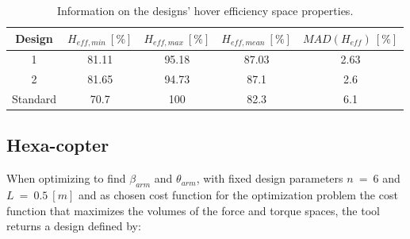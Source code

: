 {\begin{table}[!ht]
\begin{center}
 \caption{Information on the designs’ torque space properties.}\vspace{1ex}
 \label{tab:tab_Quad_compare_torque}
\end{center}
\end{table}

\begin{table}[!ht]
\begin{center}
 \caption{Information on the designs’ hover efficiency space properties.}\vspace{1ex}
 \label{tab:tab_Quad_compare_hover}
 {\scriptsize\begin{tabular}{|c|cccc|}
 \hline
  Design & $H_{eff,min}\ [\%]$ & $H_{eff,max}\ [\%]$ & $H_{eff,mean}\ [\%]$
  & $MAD(H_{eff})\ [\%]$\\ \hline
  1 & 81.11 & 95.18 & 87.03 & 2.63\\
  2 & 81.65 & 94.73 & 87.1 & 2.6\\
  Standard & 70.7 & 100 & 82.3 & 6.1\\
 \hline
\end{tabular}}
\end{center}
\end{table}

\clearpage

\subsection{Hexa-copter}
\label{sec:hexa_copter}

When optimizing to find $\beta_{arm}$ and $\theta_{arm}$, with fixed
design parameters $n\ =\ 6$ and $L\ =\ 0.5\ [m]$ and as chosen cost function
for the optimization problem the cost function that maximizes the volumes
of the force and torque spaces, the tool returns a design defined by:

}
